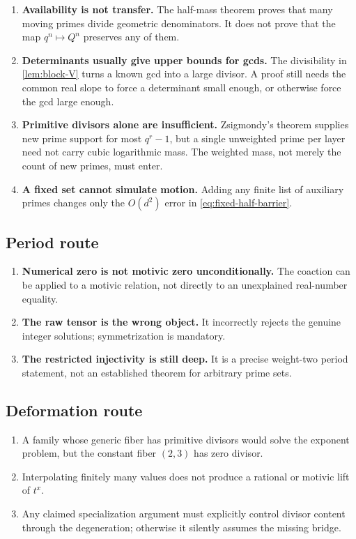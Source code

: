 \documentclass[11pt]{article}
\theoremstyle{definition}
\theoremstyle{remark}
\begin{document}
\begin{enumerate}
 \item \textbf{Availability is not transfer.}  The half-mass theorem proves
       that many moving primes divide geometric denominators.  It does not
       prove that the map $q^n\mapsto Q^n$ preserves any of them.
 \item \textbf{Determinants usually give upper bounds for gcds.}  The
       divisibility in \cref{lem:block-V} turns a known gcd into a large
       divisor.  A proof still needs the common real slope to force a
       determinant small enough, or otherwise force the gcd large enough.
 \item \textbf{Primitive divisors alone are insufficient.}  Zsigmondy's
       theorem \cite{Zsigmondy1892} supplies new prime support for most
       $q^r-1$, but a single unweighted prime per layer need not carry cubic
       logarithmic mass.  The weighted mass, not merely the count of new
       primes, must enter.
 \item \textbf{A fixed set cannot simulate motion.}  Adding any finite list
       of auxiliary primes changes only the $O(d^2)$ error in
       \eqref{eq:fixed-half-barrier}.
\end{enumerate}

\subsection{Period route}

\begin{enumerate}
 \item \textbf{Numerical zero is not motivic zero unconditionally.}  The
       coaction can be applied to a motivic relation, not directly to an
       unexplained real-number equality.
 \item \textbf{The raw tensor is the wrong object.}  It incorrectly rejects
       the genuine integer solutions; symmetrization is mandatory.
 \item \textbf{The restricted injectivity is still deep.}  It is a precise
       weight-two period statement, not an established theorem for arbitrary
       prime sets.
\end{enumerate}

\subsection{Deformation route}

\begin{enumerate}
 \item A family whose generic fiber has primitive divisors would solve the
       exponent problem, but the constant fiber $(2,3)$ has zero divisor.
 \item Interpolating finitely many values does not produce a rational or
       motivic lift of $t^x$.
 \item Any claimed specialization argument must explicitly control divisor
       content through the degeneration; otherwise it silently assumes the
       missing bridge.
\end{enumerate}
\end{document}
